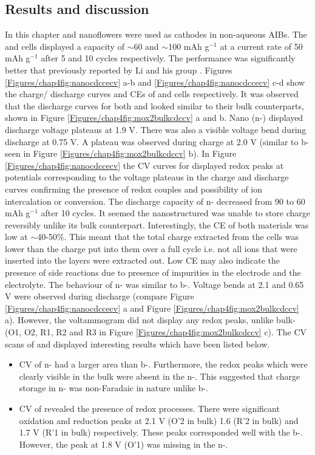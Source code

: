 \subsection{Results and discussion}
In this chapter  and  nanoflowers were used as cathodes in non-aqueous AIBs. The  and  cells displayed a capacity of $\sim$60 and $\sim$100 mAh g$^{-1}$ at a current rate of 50 mAh g$^{-1}$ after 5 and 10 cycles respectively. The performance was significantly better that previously reported by Li and his group \cite{li_rechargeable_2018}. Figures \ref{Figures/chap4fig:nanocdccecv} a-b and \ref{Figures/chap4fig:nanocdccecv} c-d show the charge/ discharge curves and CEs of  and  cells respectively. It was observed that the discharge curves for both  and  looked similar to their bulk counterparts, shown in Figure \ref{Figures/chap4fig:mox2bulkcdccv} a and b. Nano  (n-) displayed discharge voltage plateaus at 1.9 V. There was also a visible voltage bend during discharge at 0.75 V. A plateau was observed during charge at 2.0 V (similar to b- seen in Figure \ref{Figures/chap4fig:mox2bulkcdccv} b). In Figure \ref{Figures/chap4fig:nanocdccecv} the CV curves for  displayed redox peaks at potentials corresponding to the voltage plateaus in the charge and discharge curves confirming the presence of redox couples and possibility of ion intercalation or conversion. The discharge capacity of n- decreased from 90 to 60 mAh g$^{-1}$ after 10 cycles. It seemed the nanostructured  was unable to store charge reversibly unlike its bulk counterpart. Interestingly, the CE of both materials was low at $\sim$40-50\%. This meant that the total charge extracted from the cells was lower than the charge put into them over a full cycle i.e. not all ions that were inserted into the layers were extracted out. Low CE may also indicate the presence of side reactions due to presence of impurities in the electrode and the electrolyte. The behaviour of n- was similar to b-. Voltage bends at 2.1 and 0.65 V were observed during discharge (compare Figure \ref{Figures/chap4fig:nanocdccecv} a and Figure \ref{Figures/chap4fig:mox2bulkcdccv} a). However, the voltammogram did not display any redox peaks, unlike bulk- (O1, O2, R1, R2 and R3 in Figure \ref{Figures/chap4fig:mox2bulkcdccv} c). The CV scans of  and  displayed interesting results which have been listed below.  
\begin{itemize}
\item CV of n- had a larger area than b-. Furthermore, the redox peaks which were clearly visible in the bulk were absent in the n-. This suggested that charge storage in n- was non-Faradaic in nature unlike b-. 
\item CV of  revealed the presence of redox processes. There were significant oxidation and reduction peaks at 2.1 V (O'2 in bulk) 1.6 (R'2 in bulk) and 1.7 V (R'1 in bulk) respectively. These peaks corresponded well with the b-. However, the peak at 1.8 V (O'1) was missing in the n-. 
\end{itemize}
